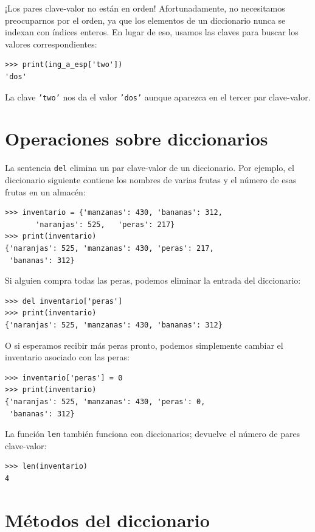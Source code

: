 ¡Los pares clave-valor no están en orden! Afortunadamente, no necesitamos
preocuparnos por el orden, ya que los elementos de un diccionario
nunca se indexan con índices enteros. En lugar de eso, usamos las
claves para buscar los valores correspondientes:
\begin{verbatim}
>>> print(ing_a_esp['two'])
'dos'
\end{verbatim}

La clave \texttt{'two'} nos da el valor \texttt{'dos'} aunque aparezca
en el tercer par clave-valor.

\section{Operaciones sobre diccionarios}

 

La sentencia \texttt{del} elimina un par clave-valor de un diccionario.
Por ejemplo, el diccionario siguiente contiene los nombres de varias
frutas y el número de esas frutas en un almacén:
\begin{verbatim}
>>> inventario = {'manzanas': 430, 'bananas': 312, 
       'naranjas': 525,   'peras': 217}
>>> print(inventario)
{'naranjas': 525, 'manzanas': 430, 'peras': 217, 
 'bananas': 312}
\end{verbatim}
 Si alguien compra todas las peras, podemos eliminar la entrada del
diccionario:
\begin{verbatim}
>>> del inventario['peras']
>>> print(inventario)
{'naranjas': 525, 'manzanas': 430, 'bananas': 312}
\end{verbatim}

O si esperamos recibir más peras pronto, podemos simplemente cambiar
el inventario asociado con las peras:
\begin{verbatim}
>>> inventario['peras'] = 0
>>> print(inventario)
{'naranjas': 525, 'manzanas': 430, 'peras': 0, 
 'bananas': 312}
\end{verbatim}
 La función \texttt{len} también funciona con diccionarios; devuelve
el número de pares clave-valor:
\begin{verbatim}
>>> len(inventario)
4
\end{verbatim}

\section{Métodos del diccionario}

